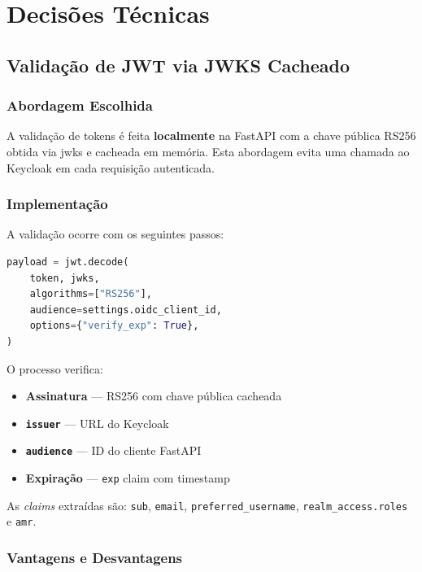 \chapter{Decisões Técnicas}
\label{chap:decisoes}

\section{Validação de JWT via JWKS Cacheado}

\subsection{Abordagem Escolhida}

A validação de tokens é feita \textbf{localmente} na FastAPI com a chave pública RS256 obtida via \gls{jwks} e cacheada em memória. Esta abordagem evita uma chamada ao Keycloak em cada requisição autenticada.

\subsection{Implementação}

A validação ocorre com os seguintes passos:

\begin{lstlisting}[language=Python, caption={Validação JWT em auth.py},label={lst:jwt}]
payload = jwt.decode(
    token, jwks,
    algorithms=["RS256"],
    audience=settings.oidc_client_id,
    options={"verify_exp": True},
)
\end{lstlisting}

O processo verifica:
\begin{itemize}
  \item \textbf{Assinatura} — RS256 com chave pública cacheada
  \item \textbf{\texttt{issuer}} — URL do Keycloak
  \item \textbf{\texttt{audience}} — ID do cliente FastAPI
  \item \textbf{Expiração} — \texttt{exp} claim com timestamp
\end{itemize}

As \textit{claims} extraídas são: \texttt{sub}, \texttt{email}, \texttt{preferred\_username}, \texttt{realm\_access.roles} e \texttt{amr}.

\subsection{Vantagens e Desvantagens}

